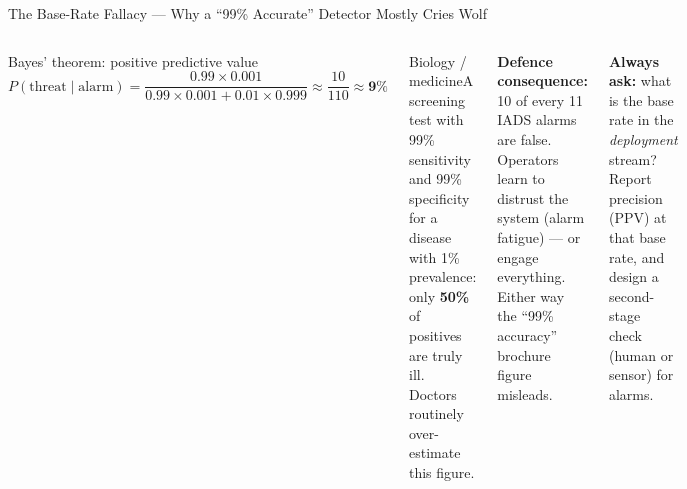 \documentclass[aspectratio=169,10pt,t]{beamer}
\begin{document}
\begin{frame}{The Base-Rate Fallacy --- Why a ``99\% Accurate'' Detector Mostly Cries Wolf}
\begin{columns}[T]
\begin{fbx}{Bayes' theorem: positive predictive value}\[P(\text{threat}\mid\text{alarm})=\frac{0.99\times0.001}{0.99\times0.001+0.01\times0.999}\approx\frac{10}{110}\approx\mathbf{9\%}\]\end{fbx}
\begin{cbox}[ISSAgrn]{Biology / medicine}\scriptsize A screening test with 99\% sensitivity and 99\% specificity for a disease with 1\% prevalence: only \textbf{50\%} of positives are truly ill. Doctors routinely over-estimate this figure.\end{cbox}
\begin{wbox}\scriptsize\textbf{Defence consequence:} 10 of every 11 IADS alarms are false. Operators learn to distrust the system (alarm fatigue) --- or engage everything. Either way the ``99\% accuracy'' brochure figure misleads.\end{wbox}
\begin{rbox}\scriptsize\textbf{Always ask:} what is the base rate in the \emph{deployment} stream? Report precision (PPV) at that base rate, and design a second-stage check (human or sensor) for alarms.\end{rbox}
\end{columns}
\end{frame}
\end{document}
